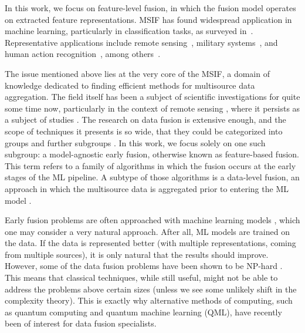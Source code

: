 \documentclass[runningheads]{llncs}
\begin{document}
In this work, we focus on
feature-level fusion, in which the fusion model operates on extracted feature
representations. MSIF has found widespread application in machine learning,
particularly in classification tasks, as surveyed
in~\cite{baltrusaitisMultimodalMachineLearning2019}. Representative applications
include remote sensing~\cite{liA3CLNNSpatialSpectral2022}, military
systems~\cite{sycaraIntegratedApproachHighlevel2009}, and human action
recognition~\cite{fortinoAdvancesMultisensorFusion2019}, among
others~\cite{liMultisourceInformationFusion2024}.

The issue mentioned above lies at the very core of the MSIF, a domain of knowledge dedicated to finding efficient methods for multisource data aggregation. 
The field itself has been a subject of scientific investigations for quite some time now, 
particularly in the context of remote sensing \cite{DataFusion1986}, where it persists as a subject of studies \cite{liA3CLNNSpatialSpectral2022}. 
The research on data fusion is extensive enough, and the scope of techniques it presents is so wide, that they could be categorized into groups and further 
subgroups \cite{baltrusaitisMultimodalMachineLearning2019}. In this work, we focus solely on one such subgroup: 
a model-agnostic early fusion, otherwise known as feature-based fusion. This term refers to a family of algorithms in which the fusion occurs 
at the early stages of the ML pipeline. A subtype of those algorithms is a data-level fusion, an approach in which the multisource data is aggregated 
prior to entering the ML model \cite{dalla_mura_challenges_2015}.

Early fusion problems are often approached with machine learning models \cite{liMultisourceInformationFusion2024,baltrusaitisMultimodalMachineLearning2019}, which one may consider a very
natural approach. After all, ML models are trained on the data. If the data is represented better (with multiple
representations, coming from multiple sources), it is only natural that the results should improve. However, some of
the data fusion problems have been shown to be NP-hard \cite{DataFusionNPQAOA}. This means that classical techniques,
while still useful, might not be able to address the problems above certain sizes (unless we see some unlikely shift
in the complexity theory). This is exactly why alternative methods of computing, such as quantum computing and
quantum machine learning (QML), have recently been of interest for data fusion specialists.
\end{document}
